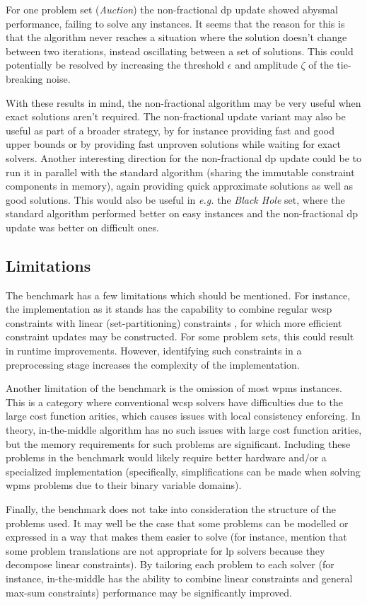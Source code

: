 For one problem set (\emph{Auction}) the non-fractional \gls{dp} update showed abysmal performance, failing to solve any instances.
It seems that the reason for this is that the algorithm never reaches a situation where the solution doesn't change between two iterations, instead oscillating between a set of solutions.
This could potentially be resolved by increasing the threshold \(\epsilon\) and amplitude \(\zeta\) of the tie-breaking noise.

With these results in mind, the non-fractional algorithm may be very useful when exact solutions aren't required.
The non-fractional update variant may also be useful as part of a broader strategy, by for instance providing fast and good upper bounds or by providing fast unproven solutions while waiting for exact solvers.
Another interesting direction for the non-fractional \gls{dp} update could be to run it in parallel with the standard algorithm (sharing the immutable constraint components in memory), again providing quick approximate solutions as well as good solutions.
This would also be useful in \emph{e.g.} the \emph{Black Hole} set, where the standard algorithm performed better on easy instances and the non-fractional \gls{dp} update was better on difficult ones.

\subsection{Limitations}
The benchmark has a few limitations which should be mentioned.
For instance, the implementation as it stands has the capability to combine regular \gls{wcsp} constraints with linear (set-partitioning) constraints \parencite[\pno~102]{Wedelin08}, for which more efficient constraint updates may be constructed.
For some problem sets, this could result in runtime improvements.
However, identifying such constraints in a preprocessing stage increases the complexity of the implementation.

Another limitation of the benchmark is the omission of most \gls{wpms} instances.
This is a category where conventional \gls{wcsp} solvers have difficulties due to the large cost function arities, which causes issues with local consistency enforcing.
In theory, in-the-middle algorithm has no such issues with large cost function arities, but the memory requirements for such problems are significant.
Including these problems in the benchmark would likely require better hardware and/or a specialized implementation (specifically, simplifications can be made when solving \gls{wpms} problems due to their binary variable domains).

Finally, the benchmark does not take into consideration the structure of the problems used.
It may well be the case that some problems can be modelled or expressed in a way that makes them easier to solve (for instance, \textcite[\pno~6]{deGivry14} mention that some problem translations are not appropriate for \gls{lp} solvers because they decompose linear constraints).
By tailoring each problem to each solver (for instance, in-the-middle has the ability to combine linear constraints and general max-sum constraints) performance may be significantly improved.
